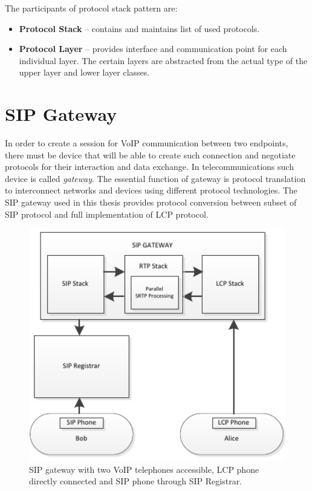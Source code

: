 The participants of protocol stack pattern are:
\begin{itemize}
\item \textbf{Protocol Stack} -- contains and maintains list of used protocols.
\item \textbf{Protocol Layer} -- provides interface and communication point for 
each individual layer. The certain layers are abstracted from the actual type of
the upper layer and lower layer classes.
\end{itemize}





\section{SIP Gateway}
In order to create a session for VoIP communication between two endpoints, 
there must be device that will be able to create such connection and negotiate
protocols for their interaction and data exchange. In telecommunications such
device is called \textit{gateway}. The essential function of gateway is 
protocol translation to interconnect networks and devices using different
protocol technologies. The SIP gateway used in this thesis provides protocol
conversion between subset of SIP protocol and full implementation of LCP 
protocol.

\begin{figure}[h!]
\centering
\includegraphics[width=13cm]{fig/scenario1.pdf}
\caption[Gateway scenario]{SIP gateway with two VoIP telephones accessible, LCP 
phone directly connected and SIP phone through SIP Registrar.}
\label{oclpm}
\end{figure}

